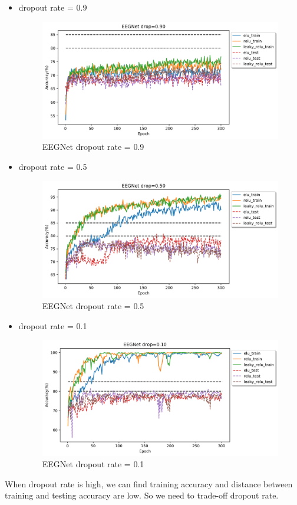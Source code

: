 \documentclass[12pt]{article}
\begin{document}
\newpage

\begin{itemize}
\item dropout rate = 0.9

\begin{figure}[H]
\centering
\includegraphics[width=\linewidth]{Images/EEGNetdrop=090.png}
\caption{EEGNet dropout rate = 0.9}
\end{figure}

\item dropout rate = 0.5

\begin{figure}[H]
\centering
\includegraphics[width=\linewidth]{Images/EEGNetdrop=050.png}
\caption{EEGNet dropout rate = 0.5}
\end{figure}

\item dropout rate = 0.1

\begin{figure}[H]
\centering
\includegraphics[width=\linewidth]{Images/EEGNetdrop=010.png}
\caption{EEGNet dropout rate = 0.1}
\end{figure}

\end{itemize}

When dropout rate is high, we can find training accuracy and distance between training and testing accuracy are low. So we need to trade-off dropout rate.
\end{document}
